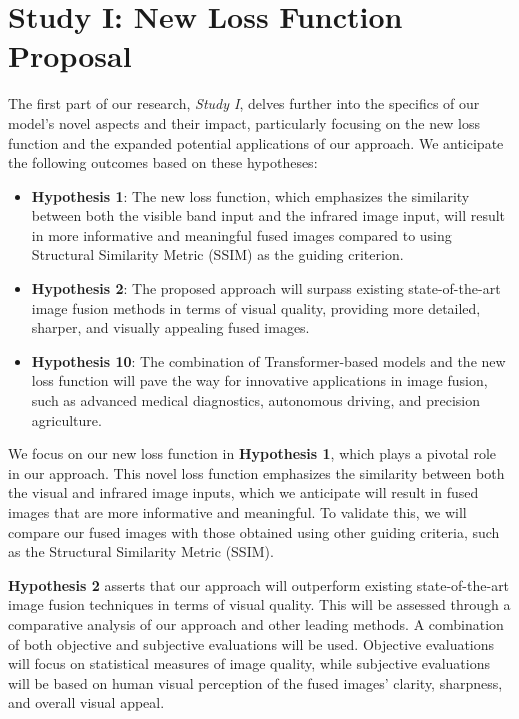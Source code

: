 \section{Study I: New Loss Function Proposal}\label{sec:study2}

The first part of our research, \textit{Study I}, delves further into the specifics of our model's novel aspects and their impact, particularly focusing on the new loss function and the expanded potential applications of our approach. We anticipate the following outcomes based on these hypotheses:

\begin{itemize}
    \item \textbf{Hypothesis 1}: The new loss function, which emphasizes the similarity between both the visible band input and the infrared image input, will result in more informative and meaningful fused images compared to using Structural Similarity Metric (SSIM) as the guiding criterion.
    
    \item \textbf{Hypothesis 2}: The proposed approach will surpass existing state-of-the-art image fusion methods in terms of visual quality, providing more detailed, sharper, and visually appealing fused images.
    
    \item \textbf{Hypothesis 10}: The combination of Transformer-based models and the new loss function will pave the way for innovative applications in image fusion, such as advanced medical diagnostics, autonomous driving, and precision agriculture.
\end{itemize}

We focus on our new loss function in \textbf{Hypothesis 1}, which plays a pivotal role in our approach. This novel loss function emphasizes the similarity between both the visual and infrared image inputs, which we anticipate will result in fused images that are more informative and meaningful. To validate this, we will compare our fused images with those obtained using other guiding criteria, such as the Structural Similarity Metric (SSIM).

\textbf{Hypothesis 2} asserts that our approach will outperform existing state-of-the-art image fusion techniques in terms of visual quality. This will be assessed through a comparative analysis of our approach and other leading methods. A combination of both objective and subjective evaluations will be used. Objective evaluations will focus on statistical measures of image quality, while subjective evaluations will be based on human visual perception of the fused images' clarity, sharpness, and overall visual appeal.

